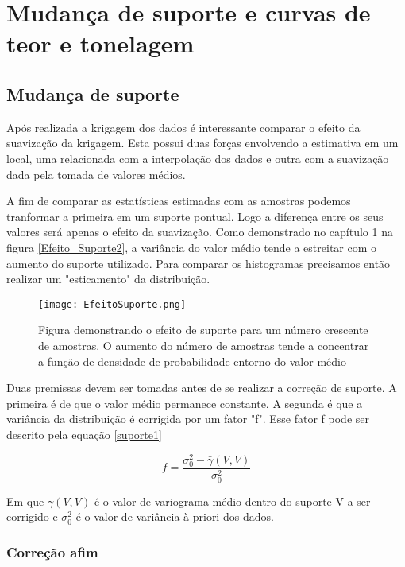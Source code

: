 \chapter{Mudança de suporte e curvas de teor e tonelagem}


\section{Mudança de suporte}

Após realizada a krigagem dos dados é interessante comparar o efeito da suavização da krigagem. Esta possui duas forças envolvendo a estimativa em um local, uma relacionada com a interpolação dos dados e outra com a suavização dada pela tomada de valores médios. 

A fim de comparar as estatísticas estimadas com as amostras podemos tranformar a primeira em um suporte pontual. Logo a diferença entre os seus valores será apenas o efeito da suavização. Como demonstrado no capítulo 1 na figura \eqref{Efeito_Suporte2}, a variância do valor médio tende a estreitar com o aumento do suporte utilizado. Para comparar os histogramas precisamos então realizar um "esticamento" da distribuição.


\begin{figure}[H]
	\centering
	\texttt{[image: EfeitoSuporte.png]}	
	\caption{Figura demonstrando o efeito de suporte para um número crescente de amostras. O aumento do número de amostras tende a concentrar a  função de densidade de probabilidade entorno do valor médio }
	\label{Efeito_Suporte2}
\end{figure} 

Duas premissas devem ser tomadas antes de se realizar a correção de suporte. A primeira é de que o valor médio permanece constante. A segunda é que a variância da distribuição é corrigida por um fator "f". Esse fator f pode ser descrito pela equação \eqref{suporte1}

\begin{equation}\label{suporte1}
	f= \frac{\sigma^2_{0} - \bar{\gamma}(V,V)}{\sigma^2_{0}}
\end{equation}

Em que $\bar{\gamma}(V,V)$ é o valor de variograma médio dentro do suporte V a ser corrigido e $\sigma^2_{0}$ é o valor de variância à priori dos dados. 

\subsection{Correção afim}

